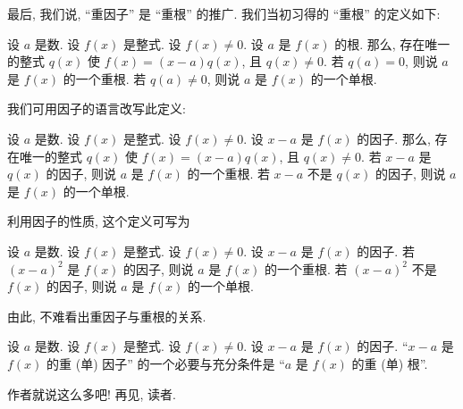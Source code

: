 最后, 我们说, ``重因子'' 是 ``重根'' 的推广. 我们当初习得的 ``重根'' 的定义如下:

\begin{definition}
    设 $a$ 是数. 设 $f(x)$ 是整式. 设 $f(x) \neq 0$. 设 $a$ 是 $f(x)$ 的根. 那么, 存在唯一的整式 $q(x)$ 使 $f(x) = (x - a) q(x)$, 且 $q(x) \neq 0$. 若 $q(a) = 0$, 则说 $a$ 是 $f(x)$ 的一个重根. 若 $q(a) \neq 0$, 则说 $a$ 是 $f(x)$ 的一个单根.
\end{definition}

我们可用因子的语言改写此定义:
\begin{definition}
    设 $a$ 是数. 设 $f(x)$ 是整式. 设 $f(x) \neq 0$. 设 $x - a$ 是 $f(x)$ 的因子. 那么, 存在唯一的整式 $q(x)$ 使 $f(x) = (x - a) q(x)$, 且 $q(x) \neq 0$. 若 $x - a$ 是 $q(x)$ 的因子, 则说 $a$ 是 $f(x)$ 的一个重根. 若 $x - a$ 不是 $q(x)$ 的因子, 则说 $a$ 是 $f(x)$ 的一个单根.
\end{definition}

利用因子的性质, 这个定义可写为
\begin{definition}
    设 $a$ 是数. 设 $f(x)$ 是整式. 设 $f(x) \neq 0$. 设 $x - a$ 是 $f(x)$ 的因子. 若 $(x - a)^2$ 是 $f(x)$ 的因子, 则说 $a$ 是 $f(x)$ 的一个重根. 若 $(x - a)^2$ 不是 $f(x)$ 的因子, 则说 $a$ 是 $f(x)$ 的一个单根.
\end{definition}

由此, 不难看出重因子与重根的关系.
\begin{proposition}
    设 $a$ 是数. 设 $f(x)$ 是整式. 设 $f(x) \neq 0$. 设 $x - a$ 是 $f(x)$ 的因子. ``$x-a$ 是 $f(x)$ 的重 (单) 因子'' 的一个必要与充分条件是 ``$a$ 是 $f(x)$ 的重 (单) 根''.
\end{proposition}

作者就说这么多吧! 再见, 读者.
